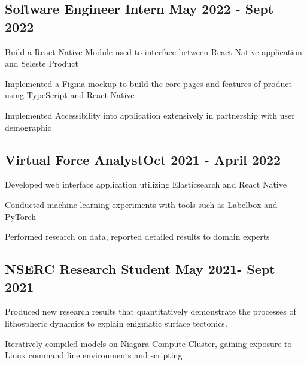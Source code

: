\documentclass[a4paper,12pt]{article}
\begin{document}


\vspace*{10pt}
\subsection{{Software Engineer Intern }\hfill May 2022 - Sept 2022}
\begin{zitemize}
\item Build a React Native Module used to interface between React Native application and Seleste Product
\item  Implemented a Figma mockup to build the core pages and features of product using TypeScript and React Native
\item Implemented Accessibility into application extensively in partnership with user demographic
\end{zitemize}

\vspace*{3pt}
\subsection{{Virtual Force Analyst}\hfill Oct 2021 - April 2022}
\begin{zitemize}
\item Developed web interface application utilizing Elasticsearch and React Native
\item Conducted machine learning experiments with tools such as Labelbox and PyTorch
\item Performed research on data, reported detailed results to domain experts
\end{zitemize}

\vspace*{3pt}
\subsection{{NSERC Research Student }\hfill May 2021- Sept 2021}
\begin{zitemize}
\item Produced new research results that quantitatively demonstrate the processes of lithospheric dynamics to explain enigmatic surface tectonics.
\item Iteratively compiled models on Niagara Compute Cluster, gaining exposure to Linux command line environments and scripting
\end{zitemize}
\end{document}
